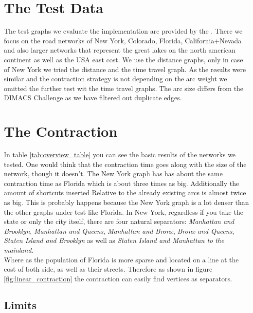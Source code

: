 \section{The Test Data}

The test graphs we evaluate the implementation are provided by the \cite[9th DIMACS Implementation Challenge - Shortest Paths]{DIMACS}. There we focus on the road networks of New York, Colorado, Florida, California+Nevada and also larger networks that represent the great lakes on the north american continent as well as the USA east cost.
We use the distance graphs, only in case of New York we tried the distance and the time travel graph. As the results were similar and the contraction strategy is not depending on the arc weight we omitted the further test wit the time travel graphs.
The arc size differs from the DIMACS Challenge as we have filtered out duplicate edges.

\section{The Contraction}

In table \ref{tab:overview_table} you can see the basic results of the networks we tested. One would think that the contraction time goes along with the size of the network, though it doesn't. The New York graph has has about the same contraction time 
as Florida which is about three times as big. Additionally the amount of shortcuts inserted Relative to the already existing arcs is almost twice as big. This is probably happens because the New York graph is a lot denser than the other graphs under test like Florida.
In New York, regardless if you take the state or only the city itself, there are four natural separators: \textit{Manhattan and Brooklyn}, \textit{Manhattan and Queens}, \textit{Manhattan and Bronx}, \textit{Bronx and Queens}, \textit{Staten Island and Brooklyn} as well as \textit{Staten Island and Manhattan to the mainland}.  
\\ 
Where as the population of Florida is more sparse and located on a line at the cost of both side, as well as their streets. Therefore as shown in figure \ref{fig:linear_contraction} the contraction can easily find vertices as separators. 

\subsection{Limits} \label{sec:contraction_limits}

